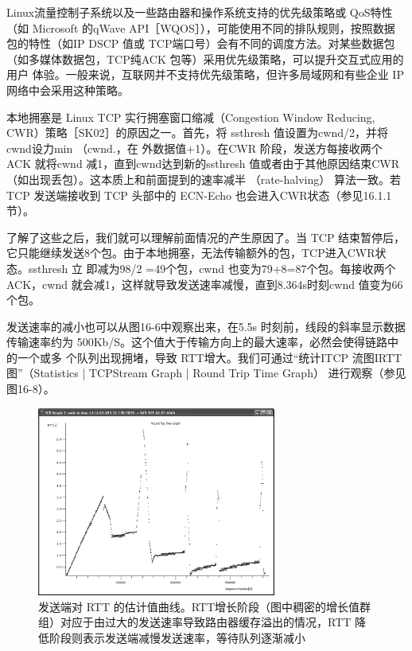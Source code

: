 \begin{tcolorbox}
    Linux流量控制子系统以及一些路由器和操作系统支持的优先级策略或 QoS特性（如 Microsoft 的qWave API［WQOS］），可能使用不同的排队规则，按照数据
    包的特性（如IP DSCP 值或 TCP端口号）会有不同的调度方法。对某些数据包（如多媒体数据包，TCP纯ACK 包等）采用优先级策略，可以提升交互式应用的用户
    体验。一般来说，互联网并不支持优先级策略，但许多局域网和有些企业 IP 网络中会采用这种策略。
\end{tcolorbox}

本地拥塞是 Linux TCP 实行拥塞窗口缩减（Congestion Window Reducing, CWR）策略［SK02］的原因之一。首先，将 ssthresh 值设置为cwnd/2，并将 cwnd设力min （cwnd.，在
外数据值+1）。在CWR 阶段，发送方每接收两个 ACK 就将cwnd 减1，直到cwnd达到新的ssthresh 值或者由于其他原因结束CWR（如出现丢包）。这本质上和前面提到的速率减半
（rate-halving） 算法一致。若 TCP 发送端接收到 TCP 头部中的 ECN-Echo 也会进入CWR状态（参见16.1.1节）。

了解了这些之后，我们就可以理解前面情况的产生原因了。当 TCP 结束暂停后，它只能继续发送8个包。由于本地拥塞，无法传输额外的包，TCP进入CWR状态。ssthresh 立
即减为98/2 =49个包，cwnd 也变为79+8=87个包。每接收两个 ACK，cwnd 就会减1，这样就导致发送速率减慢，直到8.364s时刻cwnd 值变为66个包。

发送速率的减小也可以从图16-6中观察出来，在5.5s 时刻前，线段的斜率显示数据传输速率约为 500Kb/S。这个值大于传输方向上的最大速率，必然会使得链路中的一个或多
个队列出现拥堵，导致 RTT增大。我们可通过“统计ITCP 流图IRTT 图”（Statistics | TCPStream Graph | Round Trip Time Graph） 进行观察（参见图16-8）。

\begin{figure}[!htb]
    \centering
	\includegraphics[width=0.7\textwidth]{imgs/16/16-8.png}
	\caption{发送端对 RTT 的估计值曲线。RTT增长阶段（图中稠密的增长值群组）对应于由过大的发送速率导致路由器缓存溢出的情况，RTT 降低阶段则表示发送端减慢发送速率，等待队列逐渐减小}
\end{figure}

